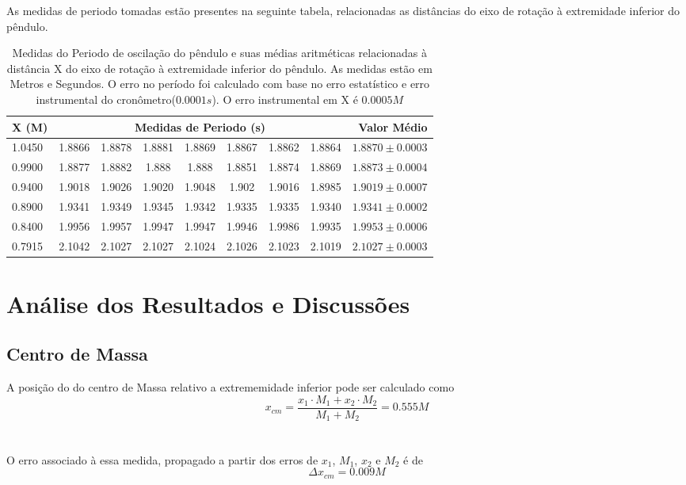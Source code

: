 \documentclass[12pt,a4paper]{article}
\begin{document}
As medidas de periodo tomadas estão presentes na seguinte tabela, relacionadas as distâncias do eixo de rotação à extremidade inferior do pêndulo. \\

\begin{table}[!htbp]
\def\arraystretch{1.5}
\begin{tabular}{|l| c c c c c c c|r|}
\hline 
X (M) & \multicolumn{7}{c|}{Medidas de Periodo (s)} & Valor Médio \\ 
\hline
1.0450 & 1.8866 & 1.8878 & 1.8881 & 1.8869 & 1.8867 & 1.8862 & 1.8864 & $1.8870 \pm 0.0003 $ \\
\hline
0.9900 & 1.8877 & 1.8882 & 1.888 & 1.888 & 1.8851 & 1.8874 & 1.8869 & $1.8873 \pm 0.0004 $\\
\hline
0.9400 & 1.9018 & 1.9026 & 1.9020 & 1.9048 & 1.902 & 1.9016 & 1.8985 & $1.9019 \pm 0.0007$\\
\hline
0.8900 & 1.9341 & 1.9349 & 1.9345 & 1.9342 & 1.9335 & 1.9335 & 1.9340 & $1.9341 \pm 0.0002$\\
\hline
0.8400 & 1.9956 & 1.9957 & 1.9947 & 1.9947 & 1.9946 & 1.9986 & 1.9935 & $1.9953 \pm 0.0006$\\
\hline
0.7915 & 2.1042 & 2.1027 & 2.1027 & 2.1024 & 2.1026 & 2.1023 & 2.1019 & $2.1027 \pm 0.0003 $\\
\hline
 
\end{tabular}
\caption{Medidas do Periodo de oscilação do pêndulo e suas médias aritméticas relacionadas à distância X do eixo de rotação à extremidade inferior do pêndulo. As medidas estão em Metros e Segundos. O erro no período foi calculado com base no erro estatístico e erro instrumental do cronômetro($0.0001 s$). O erro instrumental em X é $0.0005M$}
\end{table}


\newpage

\section{Análise dos Resultados e Discussões}
\subsection{Centro de Massa}
A posição do do centro de Massa relativo a extrememidade inferior pode ser calculado como\\
$$ x_{cm} = \frac{x_1 \cdot M_1 + x_2 \cdot M_2}{M_1 + M_2} = 0.555 M $$\\ \\
O erro associado à essa medida, propagado a partir dos erros de $x_1$, $M_1$, $x_2$ e $M_2$ é de 
$$ \Delta x_{cm} =  0.009 M $$
\end{document}
